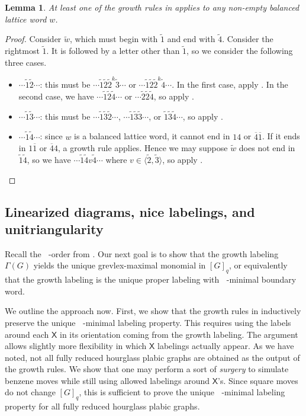 \documentclass{amsart}
\newtheorem{lemma}[theorem]{Lemma}
\theoremstyle{definition}
\theoremstyle{remark}
\numberwithin{equation}{section}
\DeclareMathOperator{\tlex}{l\widetilde{ex}}
\begin{document}
\begin{lemma}\label{lem:some-growth-rule-applies}
  At least one of the growth rules in  applies to any non-empty balanced lattice word $w$.
\end{lemma}

\begin{proof}
  Consider $\widetilde{w}$, which must begin with $\tilde{1}$ and end with $\tilde{4}$. Consider the rightmost $\tilde{1}$. It is followed by a letter other than $\tilde{1}$, so we consider the following three cases.
  \begin{itemize}
    \item $\cdots\tilde{1}\tilde{2}\cdots$: this must be $\cdots\tilde{1}\tilde{2}\tilde{2}^k\tilde{3}\cdots$ or $\cdots\tilde{1}\tilde{2}\tilde{2}^k\tilde{4}\cdots$. In the first case, apply . In the second case, we have $\cdots\tilde{1}\tilde{2}\tilde{4}\cdots$ or $\cdots\tilde{2}\tilde{2}\tilde{4}$, so apply .
    \item $\cdots\tilde{1}\tilde{3}\cdots$: this must be $\cdots\tilde{1}\tilde{3}\tilde{2}\cdots$, $\cdots\tilde{1}\tilde{3}\tilde{3}\cdots$, or $\tilde{1}\tilde{3}\tilde{4}\cdots$, so apply .
    \item $\cdots\tilde{1}\tilde{4}\cdots$: since $w$ is a balanced lattice word, it cannot end in $14$ or $\overline{4}\overline{1}$. If it ends in $1\overline{1}$ or $\overline{4}4$, a growth rule applies. Hence we may suppose $\tilde{w}$ does not end in $\tilde{1}\tilde{4}$, so we have $\cdots\tilde{1}\tilde{4}v\tilde{4}\cdots$ where $v\in \langle \tilde{2},\tilde{3}\rangle$, so apply . \qedhere
  \end{itemize}
\end{proof}

\subsection{Linearized diagrams, nice labelings, and unitriangularity}\label{sec:nicelabelings}

Recall the $\tlex$-order from . Our next goal is to show that the growth labeling $\Gamma(G)$ yields the unique grevlex-maximal monomial in $[G]_q$, or equivalently that the growth labeling is the unique proper labeling with $\tlex$-minimal boundary word.

We outline the approach now. First, we show that the growth rules in  inductively preserve the unique $\tlex$-minimal labeling property. This requires using the labels around each $\mathsf{X}$  in its orientation coming from the growth labeling. The argument allows slightly more flexibility in which $\mathsf{X}$ labelings actually appear. As we have noted, not all fully reduced hourglass plabic graphs are obtained as the output of the growth rules. We show that one may perform a sort of \emph{surgery} to simulate benzene moves while still using allowed labelings around $\mathsf{X}$'s. Since square moves do not change $[G]_q$, this is sufficient to prove the unique $\tlex$-minimal labeling property for all fully reduced hourglass plabic graphs.
\end{document}
